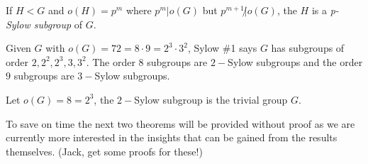 \begin{definition}
If $H<G$ and $o(H)=p^m$ where $p^m|o(G)$ but $p^{m+1}\not | o(G)$, the $H$ is a \textit{p-Sylow
subgroup} of $G$.
\end{definition}

\begin{example}
Given $G$ with $o(G)=72=8\cdot 9=2^3\cdot 3^2$, Sylow \#1 says $G$ has subgroups of order
$2,2^2,2^3,3,3^2$. The order $8$ subgroups are $2-$Sylow subgroups and the order $9$ subgroups are
$3-$Sylow subgroups.
\end{example}
\begin{example}
Let $o(G)=8=2^3$, the $2-$Sylow subgroup is the trivial group $G$.
\end{example}

To save on time the next two theorems will be provided without proof as we are currently more
interested in the insights that can be gained from the results themselves. (Jack, get some proofs
for these!)

